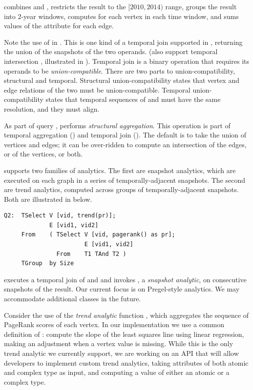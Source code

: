  combines \tgs {} and , restricts the
result to the $[2010, 2014)$ range, groups the result into 2-year
  windows, computes  for each vertex in each time
  window, and sums values of the attribute  for each edge.

Note the use of  in .  This is one kind of a
temporal join supported in \ql, returning the union of the snapshots
of the two operands.  (\ql also support temporal intersection
, illustrated in ).  Temporal join is a binary
operation that requires its operands to be {\em union-compatible}.
There are two parts to union-compatibility, structural and temporal.
Structural union-compatibility states that vertex and edge relations
of the two \tgs must be union-compatible.  Temporal
union-compatibility states that temporal sequences of  and
 must have the same resolution, and they must align.

As part of query , \ql performs {\em structural
  aggregation}.  This operation is part of temporal aggregation
() and temporal join ().  The default is to
take the union of vertices and edges; it can be over-ridden to compute
an intersection of the edges, or of the vertices, or both.

\ql supports two families of analytics.  The first are snapshot
analytics, which are executed on each graph in a series of
temporally-adjacent snapshots.  The second are trend analytics,
computed across groups of temporally-adjacent snapshots.  Both are
illustrated in  below.

\eat{{\footnotesize}}
\begin{small}
\begin{verbatim}
Q2:  TSelect V [vid, trend(pr)];
             E [vid1, vid2]  
     From    ( TSelect V [vid, pagerank() as pr];   
                       E [vid1, vid2]
               From    T1 TAnd T2 )
     TGroup  by Size
\end{verbatim}
\end{small}

 executes a temporal join of  and  and
invokes , a {\em snapshot analytic}, on
consecutive snapshots of the result.  Our current focus is on
Pregel-style  analytics.  We may accommodate additional
classes in the future.

Consider the use of the {\em trend analytic} function
, which aggregates the sequence of PageRank scores of
each vertex.  In our implementation we use a common definition of
: compute the slope of the least squares line using
linear regression, making an adjustment when a vertex value is
missing.  While this is the only trend analytic we currently support,
we are working on an API that will allow developers to implement
custom trend analytics, taking attributes of both atomic and complex
type as input, and computing a value of either an atomic or a complex
type.


